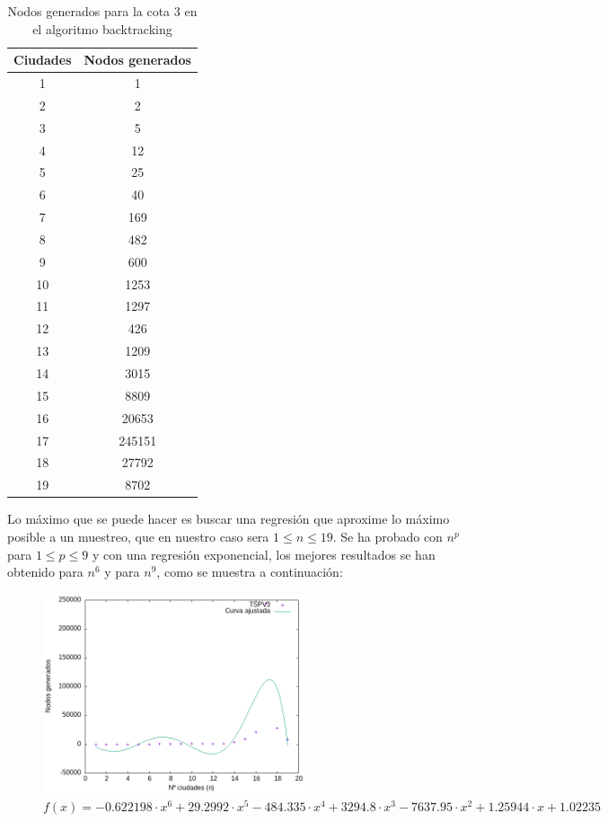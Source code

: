 \documentclass{article}
\begin{document}
\begin{table}[h!]
\centering
\begin{tabular}{|c|c|}
\hline
\textbf{Ciudades} & \textbf{Nodos generados} \\
\hline
1 & 1 \\
\hline
2 & 2 \\
\hline
3 & 5 \\
\hline
4 & 12 \\
\hline
5 & 25 \\
\hline
6 & 40 \\
\hline
7 & 169 \\
\hline
8 & 482 \\
\hline
9 & 600 \\
\hline
10 & 1253 \\
\hline
11 & 1297 \\
\hline
12 & 426 \\
\hline
13 & 1209 \\
\hline
14 & 3015 \\
\hline
15 & 8809 \\
\hline
16 & 20653 \\
\hline
17 & 245151 \\
\hline
18 & 27792 \\
\hline
19 & 8702 \\
\hline
\end{tabular}
\caption{Nodos generados para la cota 3 en el algoritmo backtracking}
\label{tab:datos}
\end{table}

Lo máximo que se puede hacer es buscar una regresión que aproxime lo máximo posible a un muestreo, que en nuestro caso sera $1 \leq n \leq 19$. Se ha probado con $n^p$ para $1 \leq p \leq 9$ y con una regresión exponencial, los mejores resultados se han obtenido para $n^6$ y para $n^9$, como se muestra a continuación:

\begin{figure}[H]
    \centering
    \includegraphics[width=0.7\textwidth]{imagenes/cota3/CurvaAjustada_n6_bk.png}
    \caption*{$f(x)=-0.622198 \cdot x^6 + 29.2992 \cdot x^5 -484.335 \cdot x^4 + 3294.8 \cdot x^3 -7637.95 \cdot x^2 + 1.25944 \cdot x + 1.02235$}
\end{figure}
\end{document}
